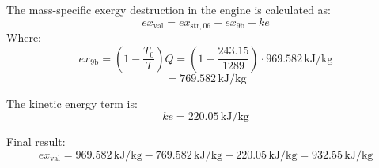 The mass-specific exergy destruction in the engine is calculated as:  
\[
ex_{\text{val}} = ex_{\text{str},06} - ex_{\text{9b}} - ke
\]  
Where:  
\[
ex_{\text{9b}} = (1 - \frac{T_0}{T}) Q = (1 - \frac{243.15}{1289}) \cdot 969.582 \, \text{kJ/kg}
\]  
\[
= 769.582 \, \text{kJ/kg}
\]  

The kinetic energy term is:  
\[
ke = 220.05 \, \text{kJ/kg}
\]  

Final result:  
\[
ex_{\text{val}} = 969.582 \, \text{kJ/kg} - 769.582 \, \text{kJ/kg} - 220.05 \, \text{kJ/kg} = 932.55 \, \text{kJ/kg}
\]